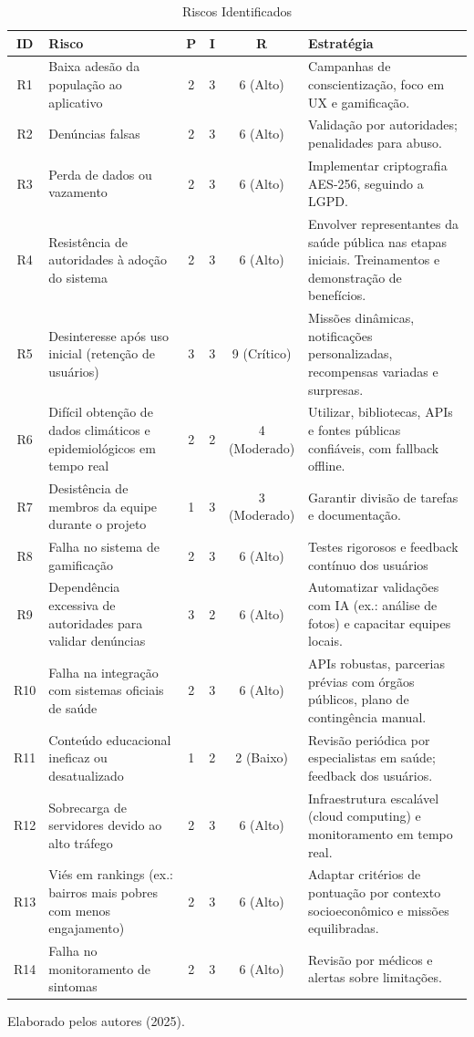 \documentclass[a5paper, 12pt]{article}
\begin{document}
\begin{table}
\caption{Riscos Identificados}
\label{tab:risks}
\begin{tabular}{|c|p{4cm}|c|c|c|p{5.7cm}|}
\hline
\textbf{ID} & \textbf{Risco} & \textbf{P} & \textbf{I} & \textbf{R} & \textbf{Estratégia} \\
\hline
R1 & Baixa adesão da população ao aplicativo & 2 & 3 & 6 (Alto) & Campanhas de conscientização, foco em UX e gamificação. \\
\hline
R2 & Denúncias falsas & 2 & 3 & 6 (Alto) & Validação por autoridades; penalidades para abuso. \\
\hline
R3 & Perda de dados ou vazamento & 2 & 3 & 6 (Alto) & Implementar criptografia AES-256, seguindo a LGPD. \\
\hline
R4 & Resistência de autoridades à adoção do sistema & 2 & 3 & 6 (Alto) & Envolver representantes da saúde pública nas etapas iniciais. Treinamentos e demonstração de benefícios. \\
\hline
R5 & Desinteresse após uso inicial (retenção de usuários) & 3 & 3 & 9 (Crítico) & Missões dinâmicas, notificações personalizadas, recompensas variadas e surpresas. \\
\hline
R6 & Difícil obtenção de dados climáticos e epidemiológicos em tempo real & 2 & 2 & 4 (Moderado) & Utilizar, bibliotecas, APIs e fontes públicas confiáveis, com fallback offline. \\
\hline
R7 & Desistência de membros da equipe durante o projeto & 1 & 3 & 3 (Moderado) & Garantir divisão de tarefas e documentação. \\
\hline
R8 & Falha no sistema de gamificação & 2 & 3 & 6 (Alto) & Testes rigorosos e feedback contínuo dos usuários\\
\hline
R9 & Dependência excessiva de autoridades para validar denúncias & 3 & 2 & 6 (Alto) & Automatizar validações com IA (ex.: análise de fotos) e capacitar equipes locais. \\
\hline
R10 & Falha na integração com sistemas oficiais de saúde & 2 & 3 & 6 (Alto) & APIs robustas, parcerias prévias com órgãos públicos, plano de contingência manual. \\
\hline
R11 & Conteúdo educacional ineficaz ou desatualizado & 1 & 2 & 2 (Baixo) & Revisão periódica por especialistas em saúde; feedback dos usuários. \\
\hline
R12 & Sobrecarga de servidores devido ao alto tráfego & 2 & 3 & 6 (Alto) & Infraestrutura escalável (cloud computing) e monitoramento em tempo real. \\
\hline
R13 & Viés em rankings (ex.: bairros mais pobres com menos engajamento) & 2 & 3 & 6 (Alto) & Adaptar critérios de pontuação por contexto socioeconômico e missões equilibradas. \\
\hline
R14 & Falha no monitoramento de sintomas  & 2 & 3 & 6 (Alto) & Revisão por médicos e alertas sobre limitações. \\
\hline
\end{tabular}
\smallskip
Elaborado pelos autores (2025).
\end{table}
\end{document}
